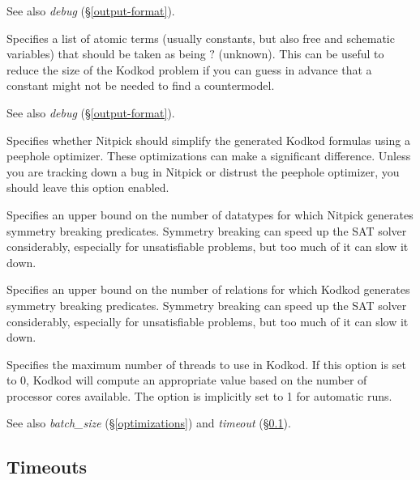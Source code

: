 \documentclass[a4paper,12pt]{article}
\def\unk{{?}}
\begin{document}
\begin{enum}
{\small See also \textit{debug} (\S\ref{output-format}).}

Specifies a list of atomic terms (usually constants, but also free and schematic
variables) that should be taken as being $\unk$ (unknown). This can be useful to
reduce the size of the Kodkod problem if you can guess in advance that a
constant might not be needed to find a countermodel.

{\small See also \textit{debug} (\S\ref{output-format}).}

Specifies whether Nitpick should simplify the generated Kodkod formulas using a
peephole optimizer. These optimizations can make a significant difference.
Unless you are tracking down a bug in Nitpick or distrust the peephole
optimizer, you should leave this option enabled.

Specifies an upper bound on the number of datatypes for which Nitpick generates
symmetry breaking predicates. Symmetry breaking can speed up the SAT solver
considerably, especially for unsatisfiable problems, but too much of it can slow
it down.

Specifies an upper bound on the number of relations for which Kodkod generates
symmetry breaking predicates. Symmetry breaking can speed up the SAT solver
considerably, especially for unsatisfiable problems, but too much of it can slow
it down.

Specifies the maximum number of threads to use in Kodkod. If this option is set
to 0, Kodkod will compute an appropriate value based on the number of processor
cores available. The option is implicitly set to 1 for automatic runs.

\nopagebreak
{\small See also \textit{batch\_size} (\S\ref{optimizations}) and
\textit{timeout} (\S\ref{timeouts}).}
\end{enum}

\subsection{Timeouts}
\label{timeouts}
\end{document}
